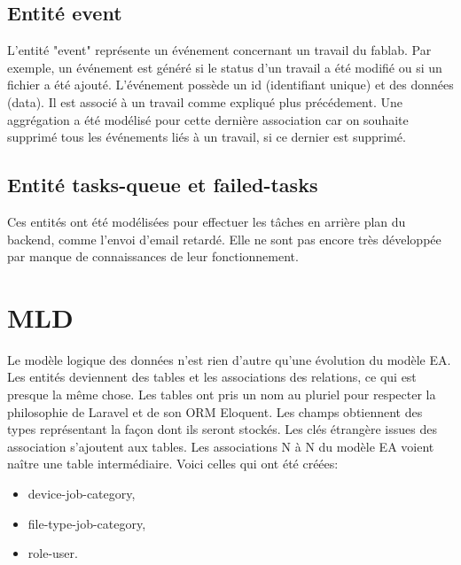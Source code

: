 \documentclass[
    iai, %
    il, %
]{heig-tb}
\begin{document}
\subsection{Entité event}
L'entité "event" représente un événement concernant un travail du fablab. Par exemple, un événement est généré si le status d'un travail a été modifié ou si un fichier a été ajouté.\newline
L'événement possède un id (identifiant unique) et des données (data).\newline
Il est associé à un travail comme expliqué plus précédement.\newline
Une aggrégation a été modélisé pour cette dernière association car on souhaite supprimé tous les événements liés à un travail, si ce dernier est supprimé.

\subsection{Entité tasks-queue et failed-tasks}
Ces entités ont été modélisées pour effectuer les tâches en arrière plan du backend, comme l'envoi d'email retardé. Elle ne sont pas encore très développée par manque de connaissances de leur fonctionnement.

\section{MLD}
Le modèle logique des données n'est rien d'autre qu'une évolution du modèle EA.\newline
Les entités deviennent des tables et les associations des relations, ce qui est presque la même chose.\newline
Les tables ont pris un nom au pluriel pour respecter la philosophie de Laravel et de son ORM Eloquent.\newline
Les champs obtiennent des types représentant la façon dont ils seront stockés.\newline
Les clés étrangère issues des association s'ajoutent aux tables.\newline
Les associations N à N du modèle EA voient naître une table intermédiaire. Voici celles qui ont été créées:
\begin{itemize}
    \item device-job-category,
    \item file-type-job-category,
    \item role-user.
\end{itemize}
\end{document}
